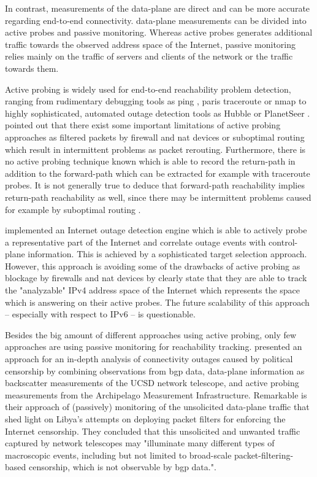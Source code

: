 In contrast, measurements of the \gls{data-plane} are direct and can be more accurate regarding end-to-end connectivity. 
\Gls{data-plane} measurements can be divided into active probes and passive monitoring. 
Whereas active probes generates additional traffic towards the observed address space of the Internet, passive monitoring relies mainly on the traffic of servers and clients of the network or the traffic towards them. 

Active probing is widely used for end-to-end reachability problem detection, ranging from rudimentary debugging tools as ping \citep{PING}, paris traceroute \citep{traceroute} or nmap \citep{Nmap} to highly sophisticated, automated
outage detection tools as Hubble \citep{Katz:2008} or PlanetSeer \citep{Zhang:2004}. 
\citet{Bush:Optometry} pointed out that there exist some important limitations of active probing approaches as filtered packets by firewall and \gls{nat} devices or suboptimal routing which result in intermittent problems as packet rerouting.
Furthermore, there is no active probing technique known which is able to record the return-path in addition to the forward-path which can be extracted for example with traceroute probes. 
It is not generally true to deduce that forward-path reachability implies return-path reachability as well, since there may be intermittent problems caused for example by suboptimal routing \citep{Bush:Optometry}.

\citet{Quan12a} implemented an Internet outage detection engine which is able to actively probe a representative part of the Internet and correlate outage events with \gls{control-plane} information. 
This is achieved by a sophisticated target selection approach. 
However, this approach is avoiding some of the drawbacks of active probing as blockage by firewalls and \gls{nat} devices by clearly state that they are able to track the "analyzable" \gls{IPv4} address space of the Internet which represents the space which is answering on their active probes.
The future scalability of this approach -- especially with respect to \gls{IPv6} -- is questionable. 

Besides the big amount of different approaches using active probing, only few approaches are using passive monitoring for reachability tracking. 
\citet{Dainotti:2011:ACI} presented an approach for an in-depth analysis of connectivity outages caused by political censorship by combining observations from \gls{bgp} data, \gls{data-plane} information as backscatter measurements of the UCSD network telescope, and active probing measurements from the Archipelago Measurement Infrastructure. 
Remarkable is their approach of (passively) monitoring of the unsolicited \gls{data-plane} traffic that shed light on Libya's attempts on deploying packet filters for enforcing the Internet censorship. 
They concluded that this unsolicited and unwanted traffic captured by network telescopes may "illuminate many different types of macroscopic events, including but not limited to broad-scale packet-filtering-based censorship, which is not observable by \gls{bgp} data."\citep{Dainotti:2011:ACI}.

